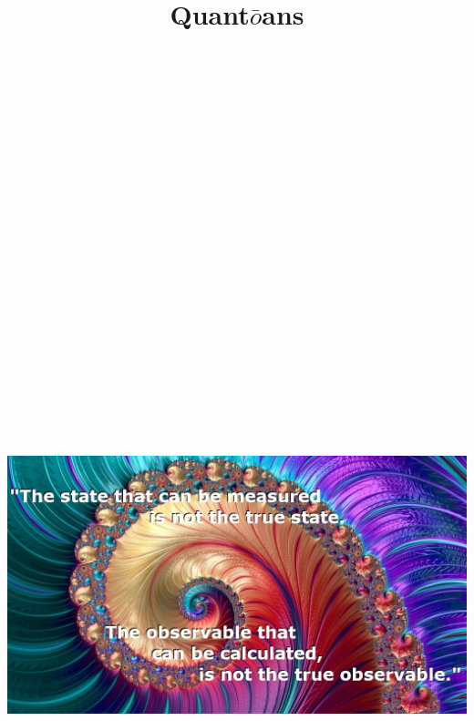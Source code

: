 \documentclass{book}
\begin{document}
	\pagecolor{blue!50!black}
	\color{blue!50!white}
	\title{ \Huge Quant$\bar{o}$ans}
	\maketitle
	\newpage
	\centering
	\includegraphics[height=30cm]{images/koan1.jpg}
\end{document}
